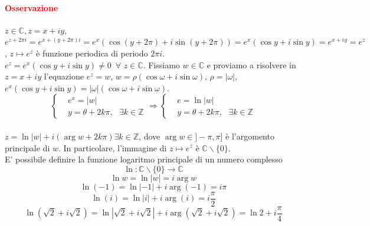 \documentclass{article}
\newcommand{\C}{\mathbb{C}}
\newcommand{\Z}{\mathbb{Z}}
\begin{document}
\paragraph{\textcolor{red}{Osservazione}}
$z \in \C, z=x+iy$, $e^{z+2\pi i}=e^{x+(y+2\pi)i}=e^x(\cos(y+2\pi)+i\sin(y+2\pi))=e^x(\cos y + i \sin y) =e^{x+iy}=e^z$, $z \mapsto e^z$ è funzione periodica di periodo $2\pi i$.\\
$e^z=e^x(\cos y+i \sin y)\neq 0\,\,\, \forall \,\, z \in \C$. Fissiamo $w \in \C$ e proviamo a risolvere in $z =x+iy$ l'equazione $e^z=w$, $w=\rho (\cos \omega + i \sin \omega)$, $\rho =|\omega|$, $e^x(\cos y+i \sin y)=|\omega|(\cos \omega+i\sin \omega)$.\\
\begin{equation*}
    \begin{cases}
        & e^x=|w| \\
        & y=\theta+2k\pi,\,\,\,\, \exists k\in\Z
    \end{cases} \Rightarrow \begin{cases}
        & e=\ln |w|\\
        & y=\theta+2k\pi,\,\,\,\, \exists k\in\Z
    \end{cases}
\end{equation*}\\
$z =\ln |w|+i(\arg w + 2k\pi) \exists k \in \Z$, dove $\arg w \in ]-\pi,\pi]$ è l'argomento principale di $w$. In particolare, l'immagine di $z \mapsto e^z$ è $\C \backslash \{0\}$.\\
E' possibile definire la funzione logaritmo principale di un numero complesso 
\begin{equation*}
    \ln: \C \backslash\{0\}\rightarrow\C
\end{equation*}
\begin{equation*}
    \ln w=\ln|w|=i \arg w
\end{equation*}
\begin{equation*}
    \ln (-1)=\ln|-1|+i\arg(-1)=i\pi
\end{equation*}
\begin{equation*}
    \ln (i)=\ln |i|+i\arg(i)=i \frac{\pi}{2}
\end{equation*}
\begin{equation*}
    \ln(\sqrt{2}+i\sqrt{2})=\ln|\sqrt{2}+i\sqrt{2}|+i \arg(\sqrt{2}+i\sqrt{2})=\ln2+i\frac{\pi}{4}
\end{equation*}
\end{document}
